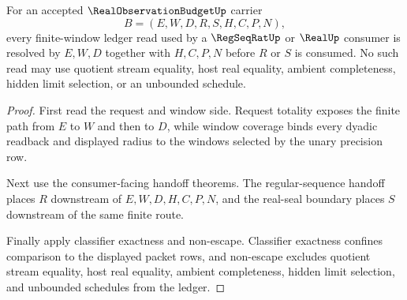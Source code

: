 \begin{theorem}
\label{thm:real-observation-budget-finite-window-ledger-resolution}
For an accepted $\RealObservationBudgetUp$ carrier
$$
B=(E,W,D,R,S,H,C,P,N),
$$
every finite-window ledger read used by a $\RegSeqRatUp$ or $\RealUp$ consumer is resolved by $E,W,D$ together with $H,C,P,N$ before $R$ or $S$ is consumed. No such read may use quotient stream equality, host real equality, ambient completeness, hidden limit selection, or an unbounded schedule.
\end{theorem}
\begin{proof}
First read the request and window side. Request totality exposes the finite path from $E$ to $W$ and then to $D$, while window coverage binds every dyadic readback and displayed radius to the windows selected by the unary precision row.

Next use the consumer-facing handoff theorems. The regular-sequence handoff places $R$ downstream of $E,W,D,H,C,P,N$, and the real-seal boundary places $S$ downstream of the same finite route.

Finally apply classifier exactness and non-escape. Classifier exactness confines comparison to the displayed packet rows, and non-escape excludes quotient stream equality, host real equality, ambient completeness, hidden limit selection, and unbounded schedules from the ledger.
\end{proof}

